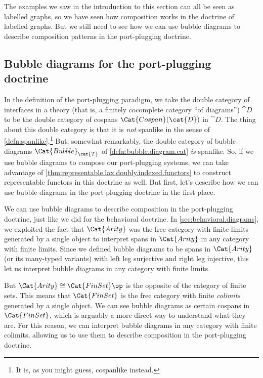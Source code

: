\documentclass[DynamicalBook]{subfiles}
\begin{document}
  The examples we saw in the introduction to this section can all be seen as labelled graphs, so we have seen how composition works in the doctrine of labelled graphs. But we still need to see how we can use bubble diagrams to describe composition patterns in the port-plugging doctrine.

\subsection{Bubble diagrams for the port-plugging doctrine}

In the definition of the port-plugging paradigm, we take the double category of interfaces in a theory (that is, a finitely cocomplete category ``of diagrams'') $\cat{D}$ to be the double category of cospans $\Cat{Cospan}(\cat{D})$ in $\cat{D}$. The thing about this double category is that it is \emph{not} spanlike in the sense of \cref{defn:spanlike}.\footnote{It is, as you might guess, cospanlike instead.} But, somewhat remarkably, the double category of bubble diagrams $\Cat{Bubble}_{\cat{T}}$ of \cref{defn:bubble.diagram.cat} \emph{is} spanlike. So, if we use bubble diagrams to compose our port-plugging systems, we can take advantage of \cref{thm:representable.lax.doubly.indexed.functors} to construct representable functors in this doctrine as well.
But first, let's describe how we can use bubble diagrams in the port-plugging doctrine in the first place.

We can use bubble diagrams to describe composition in the port-plugging doctrine, just like we did for the behavioral doctrine. In \cref{sec:behavioral.diagrams}, we exploited the fact that $\Cat{Arity}$ was the free category with finite limits generated by a single object to interpret spans in $\Cat{Arity}$ in any category with finite limits. Since we defined bubble diagrams to be spans in $\Cat{Arity}$ (or its many-typed variants) with left leg surjective and right leg injective, this let us interpret bubble diagrams in any category with finite limits.

But $\Cat{Arity} \cong \Cat{FinSet}\op$ is the opposite of the category of finite sets. This means that $\Cat{FinSet}$ is the free category with finite \emph{colimits} generated by a single object. We can see bubble diagrams as certain cospans in $\Cat{FinSet}$, which is arguably a more direct way to understand what they are. For this reason, we can interpret bubble diagrams in any category with finite colimits, allowing us to use them to describe composition in the port-plugging doctrine.
\end{document}
